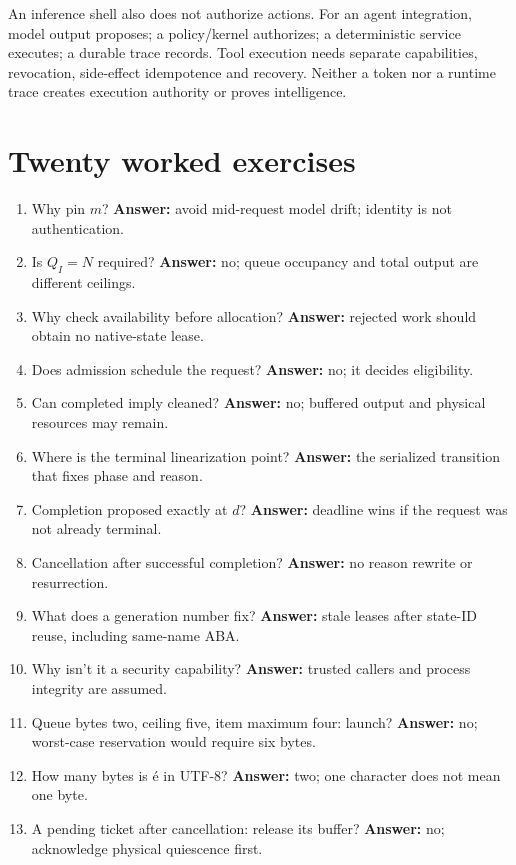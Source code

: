 An inference shell also does not authorize actions. For an agent integration,
model output proposes; a policy/kernel authorizes; a deterministic service executes;
a durable trace records. Tool execution needs separate capabilities, revocation,
side-effect idempotence and recovery. Neither a token nor a runtime trace creates
execution authority or proves intelligence.

\section{Twenty worked exercises}
\begin{enumerate}
\item Why pin $m$? \textbf{Answer:} avoid mid-request model drift; identity is not authentication.
\item Is $Q_I=N$ required? \textbf{Answer:} no; queue occupancy and total output are different ceilings.
\item Why check availability before allocation? \textbf{Answer:} rejected work should obtain no native-state lease.
\item Does admission schedule the request? \textbf{Answer:} no; it decides eligibility.
\item Can completed imply cleaned? \textbf{Answer:} no; buffered output and physical resources may remain.
\item Where is the terminal linearization point? \textbf{Answer:} the serialized transition that fixes phase and reason.
\item Completion proposed exactly at $d$? \textbf{Answer:} deadline wins if the request was not already terminal.
\item Cancellation after successful completion? \textbf{Answer:} no reason rewrite or resurrection.
\item What does a generation number fix? \textbf{Answer:} stale leases after state-ID reuse, including same-name ABA.
\item Why isn't it a security capability? \textbf{Answer:} trusted callers and process integrity are assumed.
\item Queue bytes two, ceiling five, item maximum four: launch? \textbf{Answer:} no; worst-case reservation would require six bytes.
\item How many bytes is é in UTF-8? \textbf{Answer:} two; one character does not mean one byte.
\item A pending ticket after cancellation: release its buffer? \textbf{Answer:} no; acknowledge physical quiescence first.

\end{enumerate}
